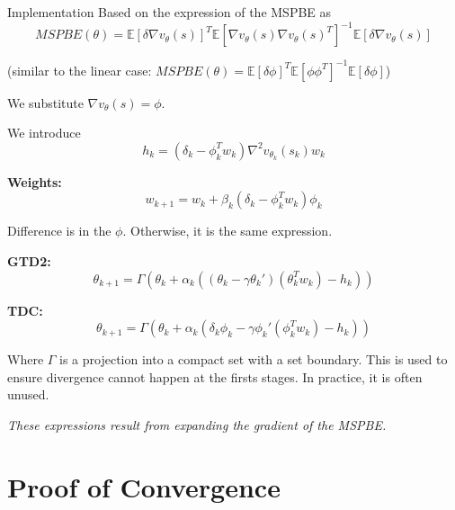 \documentclass[11pt]{beamer}
\begin{document}
\begin{frame}[allowframebreaks]{Implementation}
	Based on the expression of the MSPBE as
	$$ MSPBE(\theta) = \mathbb{E}[\delta\nabla{}v_\theta(s)]^T \mathbb{E}[\nabla{}v_\theta(s)\nabla{}v_\theta(s)^T]^{-1} \mathbb{E}[\delta\nabla{}v_\theta(s)] $$
	{\footnotesize (similar to the linear case: $MSPBE(\theta) = \mathbb{E}[\delta\phi]^T\mathbb{E}[\phi\phi^T]^{-1}\mathbb{E}[\delta\phi]$)
		
	We substitute $\nabla{}v_\theta(s) = \phi$.}
	
	\vspace{1.5em}
	We introduce
	\begin{equation}
		h_k = (\delta_k - \phi_k^Tw_k)\nabla^2v_{\theta_k}(s_k)w_k
	\end{equation}
	
	\vspace{1.5em}
	\textbf{Weights:}
	\begin{equation} \label{eqn:w}
		w_{k+1} = w_k + \beta_k(\delta_k - \phi_k^Tw_k)\phi_k
	\end{equation}
	\begin{flushright}
		{\footnotesize Difference is in the $\phi$. Otherwise, it is the same expression.}
	\end{flushright}
	
	\framebreak
	
	\textbf{GTD2:}
	\begin{equation} \label{eqn:gtd}
		\theta_{k+1} = \Gamma\left(\theta_k + \alpha_k\left((\theta_k - \gamma\theta_k')(\theta_k^Tw_k) - h_k\right)\right)
	\end{equation}
	
	\textbf{TDC:}
	\begin{equation} \label{eqn:tdc}
		\theta_{k+1} = \Gamma\left(\theta_k + \alpha_k\left(\delta_k\phi_k - \gamma\phi_k'(\phi_k^Tw_k) - h_k\right)\right)
	\end{equation}
	
	\vspace{1em}
	
	Where $\Gamma$ is a projection into a compact set with a set boundary. This is used to ensure divergence cannot happen at the firsts stages. In practice, it is often unused.
	
	\framebreak
	
	\textit{These expressions result from expanding the gradient of the MSPBE.}
\end{frame}

\section{Proof of Convergence}
\end{document}
